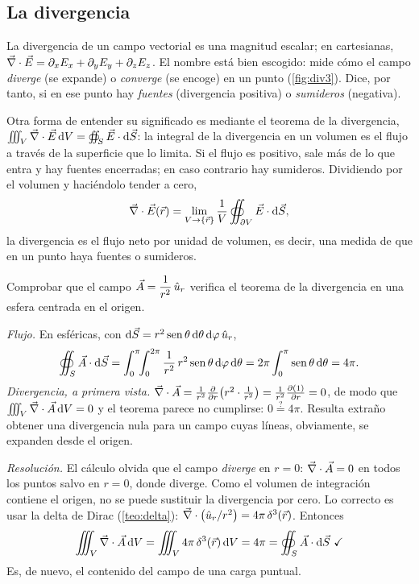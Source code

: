 \subsection{La divergencia}\label{app:divergencia}
La divergencia de un campo vectorial es una magnitud escalar; en cartesianas,
$\vec{\nabla}\cdot\vec{E}=\partial_xE_x+\partial_yE_y+\partial_zE_z$. El nombre está bien escogido: mide cómo el campo \emph{diverge} (se expande) o \emph{converge} (se encoge) en un punto (\cref{fig:div3}).
Dice, por tanto, si en ese punto hay \emph{fuentes} (divergencia positiva) o \emph{sumideros} (negativa).



Otra forma de entender su significado es mediante el teorema de la divergencia, $\iiint_{V}\vec{\nabla}\cdot\vec{E}\,\mathrm{d} V=\oiint_{S}\vec{E}\cdot\mathrm{d}\vec{S}$: la integral de la divergencia en un volumen es el flujo a través de la superficie que lo limita. Si el flujo es positivo, sale más de lo que entra y hay fuentes encerradas;
en caso contrario hay sumideros. Dividiendo por el volumen y haciéndolo tender a cero,
\begin{equation}\label{eq:div-limite}
  \vec{\nabla}\cdot\vec{E}(\vec{r})=\lim_{V\to\{\vec{r}\}}\frac{1}{V}\oiint_{\partial V}\vec{E}\cdot\mathrm{d}\vec{S},
\end{equation}
la divergencia es el flujo neto por unidad de volumen, es decir, una medida de que en un punto haya fuentes o sumideros.

\begin{ejemplo}\label{ej:div-r2}
Comprobar que el campo $\vec{A}=\dfrac{1}{r^{2}}\,\hat{u}_{r}$ verifica el teorema de la divergencia en una esfera centrada en el origen.

\emph{Flujo.} En esféricas, con $\mathrm{d}\vec{S}=r^{2}\operatorname{sen}\theta\,\mathrm{d}\theta\,\mathrm{d}\varphi\,\hat{u}_{r}$,
\[
  \oiint_{S}\vec{A}\cdot\mathrm{d}\vec{S}=\int_{0}^{\pi}\!\!\int_{0}^{2\pi}\frac{1}{r^{2}}\,r^{2}\operatorname{sen}\theta\,\mathrm{d}\varphi\,\mathrm{d}\theta=2\pi\int_{0}^{\pi}\operatorname{sen}\theta\,\mathrm{d}\theta=4\pi .
\]
\emph{Divergencia, a primera vista.} $\vec{\nabla}\cdot\vec{A}=\frac{1}{r^{2}}\frac{\partial }{\partial r}\bigl(r^{2}\cdot\frac{1}{r^{2}}\bigr)=\frac{1}{r^{2}}\frac{\partial (1)}{\partial r}=0$, de modo que $\iiint_{V}\vec{\nabla}\cdot\vec{A}\,\mathrm{d} V=0$ y el teorema parece no cumplirse: $0\overset{?}{=}4\pi$.
Resulta extraño obtener una divergencia nula para un campo cuyas líneas, obviamente, se expanden desde el origen.

\emph{Resolución.} El cálculo olvida que el campo \emph{diverge} en $r=0$: $\vec{\nabla}\cdot\vec{A}=0$ en todos los puntos salvo en $r=0$, donde diverge. Como el volumen de integración contiene el origen, no se puede sustituir la divergencia por cero. Lo correcto es usar la delta de Dirac (\cref{teo:delta}):
$\vec{\nabla}\cdot\bigl(\hat{u}_{r}/r^{2}\bigr)=4\pi\,\delta^{3}(\vec{r})$. Entonces
\[
  \iiint_{V}\nab\cdot\vc{A}\,\dV=\iiint_{V}4\pi\,\delta^{3}(\vc{r})\,\dV=4\pi=\oiint_{S}\vc{A}\cdot\dS\ \checkmark
\]
Es, de nuevo, el contenido del campo de una carga puntual.
\end{ejemplo}

